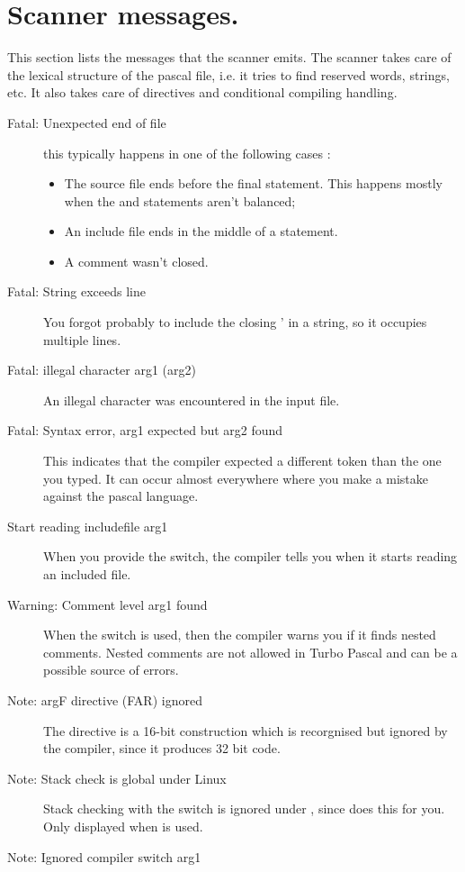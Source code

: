  \section{Scanner messages.}
 This section lists the messages that the scanner emits. The scanner takes
 care of the lexical structure of the pascal file, i.e. it tries to find
 reserved words, strings, etc. It also takes care of directives and
 conditional compiling handling.
 \begin{description}
\item [Fatal: Unexpected end of file]
 this typically happens in one of the following cases :
 \begin{itemize}
 \item The source file ends before the final  statement. This
 happens mostly when the  and  statements aren't
 balanced;
 \item An include file ends in the middle of a statement.
 \item A comment wasn't closed.
 \end{itemize}
\item [Fatal: String exceeds line]
 You forgot probably to include the closing ' in a string, so it occupies
 multiple lines.
\item [Fatal: illegal character arg1 (arg2)]
 An illegal character was encountered in the input file.
\item [Fatal: Syntax error, arg1 expected but arg2 found]
 This indicates that the compiler expected a different token than
 the one you typed. It can occur almost everywhere where you make a
 mistake against the pascal language.
\item [Start reading includefile arg1]
 When you provide the  switch, the compiler tells you
 when it starts reading an included file.
\item [Warning: Comment level arg1 found]
 When the  switch is used, then the compiler warns you if
 it finds nested comments. Nested comments are not allowed in Turbo Pascal
 and can be a possible source of errors.
\item [Note: argF directive (FAR) ignored]
 The  directive is a 16-bit construction which is recorgnised
 but ignored by the compiler, since it produces 32 bit code.
\item [Note: Stack check is global under Linux]
 Stack checking with the  switch is ignored under \linux, since
 \linux does this for you. Only displayed when  is used.
\item [Note: Ignored compiler switch arg1]

\end{description}
